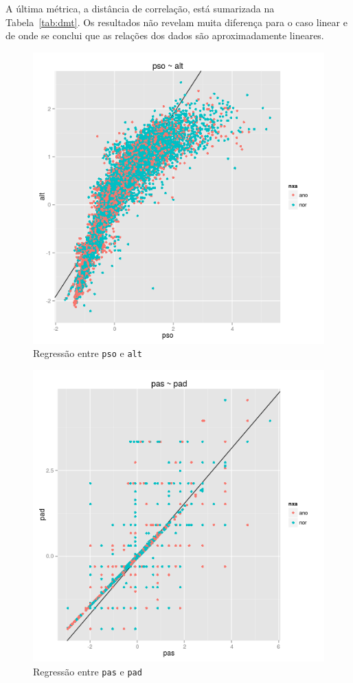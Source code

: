 \documentclass[10pt, conference, compsocconf]{IEEEtran}
\begin{document}
A última métrica, a distância de correlação, está sumarizada na
Tabela~\ref{tab:dmt}. Os resultados não revelam muita diferença para o
caso linear e de onde se conclui que as relações dos dados são
aproximadamente lineares.

\begin{figure}[H]
  \centering
  \includegraphics[scale=0.4]{img/reg_pso_alt.png}
  \caption{Regressão entre {\tt pso} e {\tt alt}}
  \label{fig:reg1}
\end{figure}

\begin{figure}[H]
  \centering
  \includegraphics[scale=0.4]{img/reg_pas_pad.png}
  \caption{Regressão entre {\tt pas} e {\tt pad}}
  \label{fig:reg2}
\end{figure}
\end{document}

